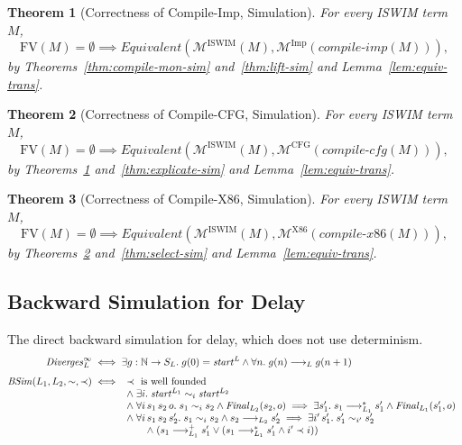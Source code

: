\documentclass[10pt]{article}
\theoremstyle{acmplain}
\newtheorem{theorem}{Theorem}[section]
\newcommand{\pass}[1]{\mathit{#1}}
\newcommand{\FV}{\mathrm{FV}}
\newcommand{\Mach}[1]{\mathcal{M}^{#1}}
\newcommand{\start}[1]{\mathit{start}^{#1}}
\newcommand{\Final}{\mathit{Final}}
\newcommand{\Div}{\mathit{Diverges}}
\newcommand{\Equiv}{\mathit{Equivalent}}
\newcommand{\BSim}{\mathit{BSim}}
\newcommand{\lto}{\longrightarrow}
\begin{document}
\begin{theorem}[Correctness of Compile-Imp, Simulation]\label{thm:compile-imp-sim}
For every ISWIM term $M$,
\[
  \FV(M) = \emptyset \implies \Equiv(\Mach{\mathrm{ISWIM}}(M), \Mach{\mathrm{Imp}}(\pass{compile\text{-}imp}(M))) ,
\]
by Theorems~\ref{thm:compile-mon-sim} and~\ref{thm:lift-sim} and Lemma~\ref{lem:equiv-trans}.
\end{theorem}

\begin{theorem}[Correctness of Compile-CFG, Simulation]\label{thm:compile-cfg-sim}
For every ISWIM term $M$,
\[
  \FV(M) = \emptyset \implies \Equiv(\Mach{\mathrm{ISWIM}}(M), \Mach{\mathrm{CFG}}(\pass{compile\text{-}cfg}(M))) ,
\]
by Theorems~\ref{thm:compile-imp-sim} and~\ref{thm:explicate-sim} and Lemma~\ref{lem:equiv-trans}.
\end{theorem}

\begin{theorem}[Correctness of Compile-X86, Simulation]\label{thm:compile-x86-sim}
For every ISWIM term $M$,
\[
  \FV(M) = \emptyset \implies \Equiv(\Mach{\mathrm{ISWIM}}(M), \Mach{\mathrm{X86}}(\pass{compile\text{-}x86}(M))) ,
\]
by Theorems~\ref{thm:compile-cfg-sim} and~\ref{thm:select-sim} and Lemma~\ref{lem:equiv-trans}.
\end{theorem}

\subsection{Backward Simulation for Delay}

The direct backward simulation for delay, which does not use determinism.
\begin{align*}
  \Div^\infty_L &\iff \exists g : \mathbb{N} \to S_L.\;
    g(0) = \start{L} \land \forall n.\; g(n) \lto_L g(n+1) \\[1ex]
  \BSim(L_1, L_2, \sim, \prec) &\iff
  \begin{array}[t]{l}
    \prec \text{ is well founded} \\
    \land\; \exists i.\; \start{L_1} \sim_i \start{L_2} \\
    \land\; \forall i\, s_1\, s_2\, o.\; s_1 \sim_i s_2 \land \Final_{L_2}(s_2, o) \implies
      \exists s_1'.\; s_1 \lto_{L_1}^* s_1' \land \Final_{L_1}(s_1', o) \\
    \land\; \forall i\, s_1\, s_2\, s_2'.\; s_1 \sim_i s_2 \land s_2 \lto_{L_2} s_2' \implies
      \exists i'\, s_1'.\; s_1' \sim_{i'} s_2' \\
    \qquad \land\; (s_1 \lto_{L_1}^+ s_1' \lor (s_1 \lto_{L_1}^* s_1' \land i' \prec i))
  \end{array}
\end{align*}
\end{document}
